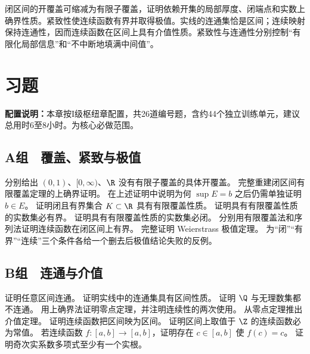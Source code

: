 闭区间的开覆盖可缩减为有限子覆盖，证明依赖开集的局部厚度、闭端点和实数上确界性质。紧致性使连续函数有界并取得极值。实线的连通集恰是区间；连续映射保持连通性，因而连续函数在区间上具有介值性质。紧致性与连通性分别控制“有限化局部信息”和“不中断地填满中间值”。

\section*{习题}

\noindent\textbf{配置说明：}本章按I级枢纽章配置，共26道编号题，含约44个独立训练单元，建议总用时6至8小时。为核心必做范围。

\subsection*{A组　覆盖、紧致与极值}
\begin{enumerate}[label=\textbf{18.\arabic*.}]
  \mustdo 分别给出 \((0,1)\)、\([0,\infty)\)、\(\R\) 没有有限子覆盖的具体开覆盖。
  \mustdo 完整重建闭区间有限覆盖定理的上确界证明。
  \mustdo 在上述证明中说明为何 \(\sup E=b\) 之后仍需单独证明 \(b\in E\)。
  \mustdo 证明闭且有界集合 \(K\subset\R\) 具有有限覆盖性质。
  \mustdo 证明具有有限覆盖性质的实数集必有界。
  \mustdo 证明具有有限覆盖性质的实数集必闭。
  \mustdo 分别用有限覆盖法和序列法证明连续函数在闭区间上有界。
  \mustdo 完整证明 Weierstrass 极值定理。
  \mustdo 为“闭”“有界”“连续”三个条件各给一个删去后极值结论失败的反例。
\end{enumerate}

\subsection*{B组　连通与介值}
\begin{enumerate}[label=\textbf{18.\arabic*.},resume]
  \mustdo 证明任意区间连通。
  \mustdo 证明实线中的连通集具有区间性质。
  \mustdo 证明 \(\Q\) 与无理数集都不连通。
  \mustdo 用上确界法证明零点定理，并注明连续性的两次使用。
  \mustdo 从零点定理推出介值定理。
  \mustdo 证明连续函数把区间映为区间。
  \mustdo 证明区间上取值于 \(\Z\) 的连续函数必为常值。
  \mustdo 若连续函数 \(f:[a,b]\to[a,b]\)，证明存在 \(c\in[a,b]\) 使 \(f(c)=c\)。
  \mustdo 证明奇次实系数多项式至少有一个实根。
\end{enumerate}

